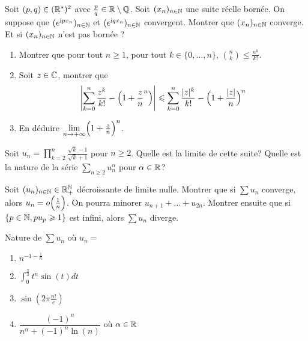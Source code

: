 \documentclass[12pt]{article}
\begin{document}
\begin{exercise}
	Soit $(p,q)\in(\mathbb{R}^{*})^{2}$ avec $\frac{p}{q}\in\mathbb{R}\setminus\mathbb{Q}$. Soit
	$(x_{n})_{n\in\mathbb{N}}$ une suite réelle bornée. On suppose que
	$(e^{\mathrm{i}px_{n}})_{n\in\mathbb{N}}$ et $(e^{\mathrm{i}qx_{n}})_{n\in\mathbb{N}}$
	convergent. Montrer que $(x_{n})_{n\in\mathbb{N}}$ converge. Et si $(x_{n})_{n\in\mathbb{N}}$
	n'est pas bornée ?
\end{exercise}

\begin{exercise}
	\phantom{}
	\begin{enumerate}
		\item
		Montrer que pour tout $n\geqslant1$, pour tout $k\in\{0,\dots,n\}$,
		$\binom{n}{k}\leqslant\frac{n^{k}}{k!}$.
		\item
		Soit $z\in\mathbb{C}$, montrer que 
		$$\Biggl\vert\sum_{k=0}^{n}\frac{z^{k}}{k!}-\Bigl(1+\frac{z}{n}^{n}\Bigr)\Biggr\vert\leqslant\sum_{k=0}^{n}\frac{\vert
		z\vert^{k}}{k!}-\Bigl(1+\frac{\vert z\vert}{n}\Bigr)^{n}$$
		\item
		En déduire $\lim\limits_{n\to+\infty}\Bigl(1+\frac{z}{n}\Bigr)^{n}$.
	\end{enumerate}
\end{exercise}

\begin{exercise}
	Soit $u_{n}=\prod_{k=2}^{n}\frac{\sqrt{k}-1}{\sqrt{k}+1}$ pour $n\geqslant 2$.
	Quelle est la limite de cette suite? Quelle est la nature de la série
	$\sum_{n\geqslant 2}u_{n}^{\alpha}$ pour $\alpha\in\mathbb{R}$?
\end{exercise}

\begin{exercise}
	Soit $(u_{n})_{n\in\mathbb{N}}\in\mathbb{R}_{+}^{\mathbb{N}}$ décroissante de limite nulle. Montrer
	que si $\sum u_{n}$ converge, alors $u_{n}=o\Bigl(\frac{1}{n}\Bigr)$. On
	pourra minorer $u_{n+1}+\dots+u_{2n}$. Montrer ensuite que si $\{p\in\mathbb{N},
	pu_{p}\geqslant1\}$ est infini, alors $\sum u_{n}$ diverge.
\end{exercise}

\begin{exercise}
	Nature de $\sum u_{n}$ où $u_{n}=$
	\begin{enumerate}
		\item
		$n^{-1-\frac{1}{n}}$
		\item
		$\int_{0}^{\frac{\pi}{2}}t^{n}\sin(t)dt$
		\item
		$\sin\left(2\pi\frac{n!}{e}\right)$
		\item
		$\dfrac{(-1)^{n}}{n^{\alpha}+(-1)^{n}\ln(n)}$ où $\alpha\in\mathbb{R}$
	\end{enumerate}
\end{exercise}
\end{document}
